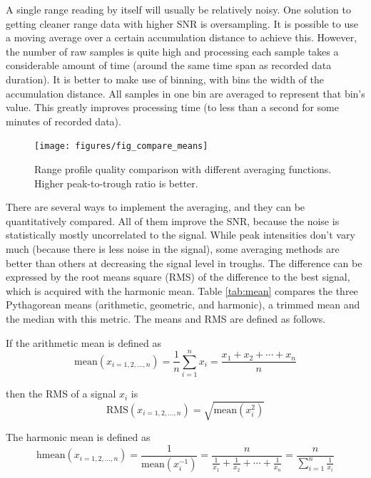 A single range reading by itself will usually be relatively
noisy. One solution to getting cleaner range data with higher SNR is
oversampling. It is possible to use a moving average over a certain
accumulation distance to achieve this. However, the number of raw
samples is quite high and processing each sample takes a considerable
amount of time (around the same time span as recorded data duration). It is
better to make use of binning, with bins the width of the accumulation
distance. All samples in one bin are averaged to represent that bin's
value. This greatly improves processing time (to less than a second for
some minutes of recorded data).

\begin{figure}[htbp]
    \centering
    \texttt{[image: figures/fig\_compare\_means]}
    \caption{Range profile quality comparison with different averaging functions. Higher peak-to-trough ratio is better.}
    \label{fig:fig_compare_means}
\end{figure}

There are several ways to implement the averaging, and they can be quantitatively compared. All of them improve the SNR, because the noise is statistically mostly uncorrelated to the signal. While peak intensities don't vary much (because there is less noise in the signal), some averaging methods are better than others at decreasing the signal level in troughs. The difference can be expressed by the root means square (RMS) of the difference to the best signal, which is acquired with the harmonic mean.
Table \cref{tab:mean} compares the three Pythagorean means (arithmetic, geometric, and harmonic), a trimmed mean and the median with this metric. The means and RMS are defined as follows.

If the arithmetic mean is defined as
\begin{equation}
        \text{mean}(x_{i=1,2,...,n}) = \frac{1}{n}\sum_{i=1}^n x_i=\frac{x_1+x_2+\cdots+x_n}{n}
\end{equation}

then the RMS of a signal $x_i$ is
\begin{equation}
    \text{RMS}(x_{i=1,2,...,n}) = \sqrt{\text{mean}(x_i^2)}
\end{equation}

The harmonic mean is defined as
\begin{equation}
    \text{hmean}(x_{i=1,2,...,n})
    = \frac{1}{\text{mean}(x_i^{-1})}
    = \frac{n}{\frac1{x_1} + \frac1{x_2} + \cdots + \frac1{x_n}} = \frac{n}{\sum\limits_{i=1}^n \frac1{x_i}}
\end{equation}

